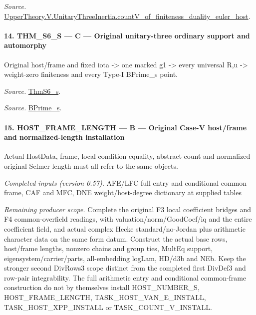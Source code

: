 \emph{Source.} \href{https://github.com/CocoSgt/riemann-hypothesis-lean/blob/7cbf7a0c32fca1badf05931879a37c3f8a2b03b4/src/Development/AutomorphicArithmetic/AutomorphicVarieties/ModularityArgument/ThresholdArguments/DenseThresholdCases/CountVOf.lean#L33-L60}{UpperTheory.V.UnitaryThreeInertia.countV\_\allowbreak of\_\allowbreak finiteness\_\allowbreak duality\_\allowbreak euler\_\allowbreak host}.



\paragraph{14. THM\_\allowbreak S6\_\allowbreak S — C — Original unitary-three ordinary support and automorphy}

Original host/frame and fixed iota -> one marked g1 -> every universal R,u -> weight-zero finiteness and every Type-I BPrime\_\allowbreak s point.

\emph{Source.} \href{https://github.com/CocoSgt/riemann-hypothesis-lean/blob/7cbf7a0c32fca1badf05931879a37c3f8a2b03b4/src/Development/AutomorphicArithmetic/AutomorphicVarieties/ModularityArgument/ThresholdArguments/DenseThresholdCases/ThmS6CoreS.lean#L17-L26}{ThmS6\_\allowbreak s}.

\emph{Source.} \href{https://github.com/CocoSgt/riemann-hypothesis-lean/blob/7cbf7a0c32fca1badf05931879a37c3f8a2b03b4/src/Development/AutomorphicArithmetic/AutomorphicVarieties/ModularityArgument/ThresholdArguments/DenseThresholdCases/ThmS6CoreS.lean#L12-L16}{BPrime\_\allowbreak s}.



\paragraph{15. HOST\_\allowbreak FRAME\_\allowbreak LENGTH — B — Original Case-V host/frame and normalized-length installation}

Actual HostData, frame, local-condition equality, abstract count and normalized original Selmer length must all refer to the same objects.

\emph{Completed inputs (version 0.57).} AFE/LFC full entry and conditional common frame, CAF and MFC, DNE weight/host-degree dictionary at supplied tables

\emph{Remaining producer scope.} Complete the original F3 local coefficient bridges and F4 common-overfield readings, with valuation/norm/GoodCoef/iq and the entire coefficient field, and actual complex Hecke standard/no-Jordan plus arithmetic character data on the same form datum. Construct the actual base rows, host/frame lengths, nonzero chains and group ties, MultEq support, eigensystem/carrier/parts, all-embedding logLam, HD/d3b and NEb. Keep the stronger second DivRows3 scope distinct from the completed first DivDef3 and row-pair integrability. The full arithmetic entry and conditional common-frame construction do not by themselves install HOST\_\allowbreak NUMBER\_\allowbreak S, HOST\_\allowbreak FRAME\_\allowbreak LENGTH, TASK\_\allowbreak HOST\_\allowbreak VAN\_\allowbreak E\_\allowbreak INSTALL, TASK\_\allowbreak HOST\_\allowbreak XPP\_\allowbreak INSTALL or TASK\_\allowbreak COUNT\_\allowbreak V\_\allowbreak INSTALL.

